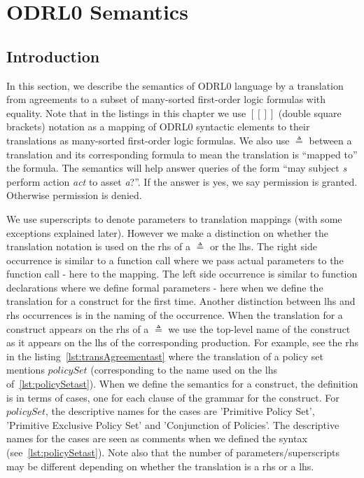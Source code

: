 \chapter{ODRL0 Semantics}\label{chap:semantics}

                  
\section{Introduction}\label{sec:introsemantics}


In this section, we describe the semantics of ODRL0 language by a translation from agreements to a subset of many-sorted first-order logic formulas with equality. Note that in the listings in this chapter we use $[\![]\!]$ (double square brackets) notation as a mapping of ODRL0 syntactic elements to their translations as many-sorted first-order logic formulas. We also use $\triangleq$ between a translation and its corresponding formula to mean the translation is ``mapped to'' the formula. The semantics will help answer queries of the form ``may subject \emph{s} perform action \emph{act} to asset \emph{a}?''. If the answer is yes, we say permission is granted. Otherwise permission is denied. 

We use superscripts to denote parameters to translation mappings (with some exceptions explained later). However we make a distinction on whether the translation notation is used on the \ac{rhs} of a $\triangleq$ or the \ac{lhs}. The right side occurrence is similar to a function call where we pass actual parameters to the function call - here to the mapping. The left side occurrence is similar to function declarations where we define formal parameters - here when we define the translation for a construct for the first time. Another distinction between \ac{lhs} and \ac{rhs} occurrences is in the naming of the occurrence. When the translation for a construct appears on the \ac{rhs} of a $\triangleq$ we use the top-level name of the construct as it appears on the \ac{lhs} of the corresponding production. For example, see the \ac{rhs} in the listing~\ref{lst:transAgreementast} where the translation of a policy set mentions $policySet$ (corresponding to the name used on the \ac{lhs} of~\ref{lst:policySetast}). When we define the semantics for a construct, the definition is in terms of cases, one for each clause of the grammar for the construct. For $policySet$, the descriptive names for the cases are 'Primitive Policy Set', 'Primitive Exclusive Policy Set' and 'Conjunction of Policies'. The descriptive names for the cases are seen as comments when we defined the syntax (see~\ref{lst:policySetast}). Note also that the number of parameters/superscripts may be different depending on whether the translation is a \ac{rhs} or a \ac{lhs}. 



